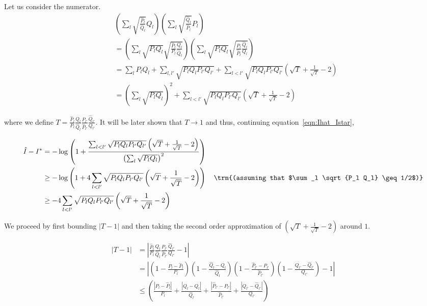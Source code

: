 \documentclass{article}
\begin{document}
Let us consider the numerator.
\begin{align*}
& \left( \sum_l \sqrt{ \frac{\hat{P}_l}{\hat{Q}_l}} Q_l \right)
\left( \sum_l \sqrt{ \frac{\hat{Q}_l}{\hat{P}_l}} P_l \right) \\
&= \left( \sum_l \sqrt{ P_l Q_l} \sqrt{ \frac{\hat{P}_l}{P_l} \frac{Q_l}{\hat{Q}_l}} \right) 
     \left( \sum_l \sqrt{P_l Q_l} \sqrt{ \frac{P_l}{\hat{P}_l} \frac{\hat{Q}_l}{ Q_l}} \right) \\
&= \sum_l P_l Q_l + \sum_{l, l'} \sqrt{P_l Q_l P_{l'} Q_{l'}} + 
   \sum_{l < l'} \sqrt{P_l Q_l P_{l'} Q_{l'}} \left( \sqrt{T} + \frac{1}{\sqrt{T}} - 2 \right) \\
&= \left( \sum_l \sqrt{P_l Q_l} \right)^2 + \sum_{l < l'} 
                  \sqrt{P_l Q_l P_{l'} Q_{l'}} \left( \sqrt{T} + \frac{1}{\sqrt{T}} - 2 \right) 
\end{align*}

where we define $T = \frac{\hat{P}_l}{P_l} \frac{Q_l}{\hat{Q}_l} 
      \frac{P_{l'}}{\hat{P}_{l'}} \frac{\hat{Q}_{l'}}{Q_{l'}}  $. It will be later shown that $T \rightarrow 1$ and thus, continuing equation~\ref{eqn:Ihat_Istar},

\begin{align}
\hat{I} - I^* &= - \log \left( 1 + \frac{ \sum_{l<l'} \sqrt{P_l Q_l P_{l'} Q_{l'}} 
    \left( \sqrt{T} + \frac{1}{\sqrt{T}} - 2 \right)}
    { \left( \sum_l \sqrt{ P_l Q_l} \right)^2 }  \right) \nonumber \\
     &  \geq  - \log \left( 1 + 4 \sum_{l<l'} \sqrt{P_l Q_l P_{l'} Q_{l'}}  
    \left( \sqrt{T} + \frac{1}{\sqrt{T}} - 2 \right)  \right) 
  \quad \trm{(assuming that $\sum_l \sqrt{P_l Q_l} \geq 1/2$)} \nonumber \\
   & \geq - 4 \sum_{l < l'} \sqrt{P_l Q_l P_{l'} Q_{l'}} 
    \left( \sqrt{T} + \frac{1}{\sqrt{T}} - 2 \right) \label{eqn:Ihat_Istar2}
\end{align}

We proceed by first bounding $|T - 1|$ and then taking the second order approximation of $\left( \sqrt{T} + \frac{1}{\sqrt{T}} - 2 \right)$ around $1$. 

\begin{align*}
|T - 1| &= \left| \frac{\hat{P}_l}{P_l} \frac{Q_l}{\hat{Q}_l} 
      \frac{P_{l'}}{\hat{P}_{l'}} \frac{\hat{Q}_{l'}}{Q_{l'}} - 1 \right| \\
 &= \left| \left( 1 - \frac{P_l - \hat{P}_l}{P_l} \right)
    \left( 1 - \frac{\hat{Q}_l - Q_l}{\hat{Q}_l} \right)
   \left( 1- \frac{\hat{P}_{l'} - P_{l'}}{\hat{P}_{l'}}\right)
   \left( 1 -  \frac{Q_{l'}- \hat{Q}_{l'}}{Q_{l'}} \right) -1 \right| \\
&\leq \left( \frac{|P_l - \hat{P}_l|}{P_l} +  \frac{|\hat{Q}_l - Q_l|}{\hat{Q}_l}
           +   \frac{| \hat{P}_{l'} - P_{l'}|}{\hat{P}_{l'}} +
               \frac{| Q_{l'} - \hat{Q}_{l'} | }{Q_{l'}} \right) 
\end{align*}
\end{document}
